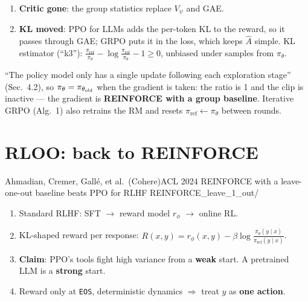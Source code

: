 \begin{enumerate}
  \item \textbf{Critic gone}: the group statistics replace $V_\psi$ and GAE.
  \item \textbf{KL moved}: PPO for LLMs adds the per-token KL to the reward, so it passes through GAE; GRPO puts it in the loss, which keeps $\hat A$ simple. KL estimator (``k3''): $\frac{\pi_{\mathrm{ref}}}{\pi_\theta}-\log\frac{\pi_{\mathrm{ref}}}{\pi_\theta}-1\ge0$, unbiased under samples from $\pi_\theta$.
\end{enumerate}

\begin{warnbox}[title={The clip never acts in their runs}]
``The policy model only has a single update following each exploration stage'' (Sec.~4.2), so $\pi_\theta=\pi_{\theta_{\mathrm{old}}}$ when the gradient is taken: the ratio is 1 and the clip is inactive --- the gradient is \textbf{REINFORCE with a group baseline}. Iterative GRPO (Alg.~1) also retrains the RM and resets $\pi_{\mathrm{ref}}\leftarrow\pi_\theta$ between rounds.
\end{warnbox}

\section{RLOO: back to REINFORCE}

  {Ahmadian, Cremer, Gall\'e, et al.\ (Cohere)}{ACL 2024}
  {REINFORCE with a leave-one-out baseline beats PPO for RLHF}
  {REINFORCE\_leave\_1\_out/}

\begin{enumerate}
  \item Standard RLHF: SFT $\to$ reward model $r_\phi$ $\to$ online RL.
  \item KL-shaped reward per response: $R(x,y)=r_\phi(x,y)-\beta\log\frac{\pi_\theta(y\mid x)}{\pi_{\mathrm{ref}}(y\mid x)}$.
  \item \textbf{Claim}: PPO's tools fight high variance from a \textbf{weak} start. A pretrained LLM is a \textbf{strong} start.
  \item Reward only at \texttt{EOS}, deterministic dynamics $\Rightarrow$ treat $y$ as \textbf{one action}.
\end{enumerate}

